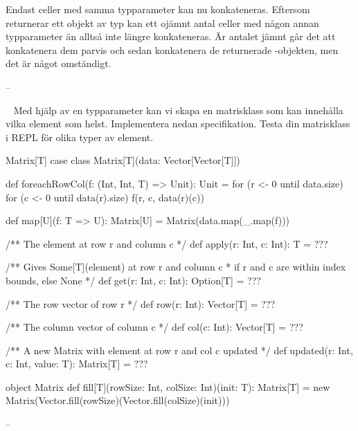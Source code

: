 \SubtaskSolved   Endast celler med samma typparameter kan nu konkateneras. Eftersom  returnerar ett objekt av typ  kan ett ojämnt antal celler med någon annan typparameter än  alltså inte längre konkateneras. Är antalet jämnt går det att konkatenera dem parvis och sedan konkatenera de returnerade -objekten, men det är något omständigt.

\SubtaskSolved   --

\QUESTEND





\QUESTBEGIN

\Task \label{task:generic-matrix} \what~   Med hjälp av en typparameter kan vi skapa en matrisklass som kan innehålla vilka element som helst. Implementera nedan specifikation. Testa din matrisklass i REPL för olika typer av element.

\begin{ScalaSpec}{Matrix[T]}
case class Matrix[T](data: Vector[Vector[T]]){

  def foreachRowCol(f: (Int, Int, T) => Unit): Unit =
    for (r <- 0 until data.size) {
      for (c <- 0 until data(r).size) {
        f(r, c, data(r)(c))
      }
    }

  def map[U](f: T => U): Matrix[U] = Matrix(data.map(_.map(f)))

  /** The element at row r and column c */
  def apply(r: Int, c: Int): T = ???

  /** Gives Some[T](element) at row r and column c
   *  if r and c are within index bounds, else None */
  def get(r: Int, c: Int): Option[T] = ???

  /** The row vector of row r */
  def row(r: Int): Vector[T] = ???

  /** The column vector of column c */
  def col(c: Int): Vector[T] = ???

  /** A new Matrix with element at row r and col c updated */
  def updated(r: Int, c: Int, value: T): Matrix[T] = ???
}
object Matrix {
  def fill[T](rowSize: Int, colSize: Int)(init: T): Matrix[T] =
    new Matrix(Vector.fill(rowSize)(Vector.fill(colSize)(init)))
}
\end{ScalaSpec}

\SOLUTION


\TaskSolved \what

\SubtaskSolved  -- %



